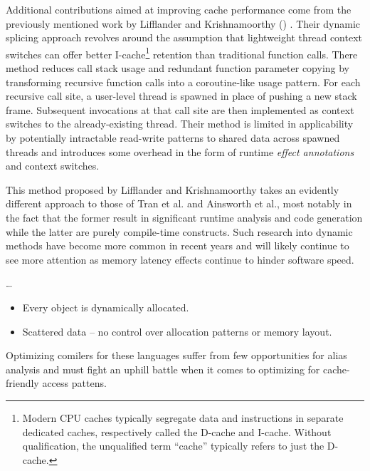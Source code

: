 \documentclass[nobib]{tufte-handout}
\newcommand{\placeholdertext}[1]{
	\noindent{\color{red}{#1}}
}
\newcommand{\CiteThis}{
({\color{red}{CITE THIS}})
}
\begin{document}
Additional contributions aimed at improving cache performance come from the previously mentioned work by Lifflander and Krishnamoorthy \CiteThis{}.  Their dynamic splicing approach revolves around the assumption that lightweight thread context switches can offer better I-cache\footnote{Modern CPU caches typically segregate data and instructions in separate dedicated caches, respectively called the D-cache and I-cache.  Without qualification, the unqualified term ``cache'' typically refers to just the D-cache.} retention than traditional function calls.  There method reduces call stack usage and redundant function parameter copying by transforming recursive function calls into a coroutine-like usage pattern.  For each recursive call site, a user-level thread is spawned in place of pushing a new stack frame.  Subsequent invocations at that call site are then implemented as context switches to the already-existing thread.  Their method is limited in applicability by potentially intractable read-write patterns to shared data across spawned threads and introduces some overhead in the form of runtime \emph{effect annotations} and context switches. 

This method proposed by Lifflander and Krishnamoorthy takes an evidently different approach to those of Tran et al. and Ainsworth et al., most notably in the fact that the former result in significant runtime analysis and code generation while the latter are purely compile-time constructs.  Such research into dynamic methods have become more common in recent years and will likely continue to see more attention as memory latency effects continue to hinder software speed.  

\placeholdertext{Languages with reference semantics (Java, C\#, Python) suffer poor cache performance because of their implicit object model.} \ldots \newline
\begin{itemize}
	\item Every object is dynamically allocated. 
	\item Scattered data -- no control over allocation patterns or memory layout.
\end{itemize}

 Optimizing comilers for these languages suffer from few opportunities for alias analysis and must fight an uphill battle when it comes to optimizing for cache-friendly access pattens.
\end{document}
